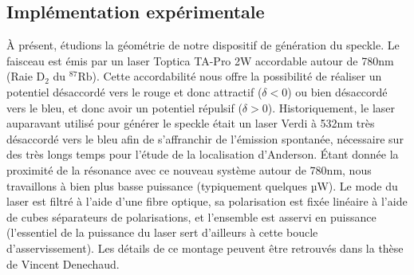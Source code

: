 
\subsection{Implémentation expérimentale}
À présent, étudions la géométrie de notre dispositif de génération du speckle. Le faisceau est émis par un laser Toptica TA-Pro 2W accordable autour de 780nm (Raie $\mathrm{D}_2$ du ${}^{87}\text{Rb}$). Cette accordabilité nous offre la possibilité de réaliser un potentiel désaccordé vers le rouge et donc attractif ($\delta < 0$) ou bien désaccordé vers le bleu, et donc avoir un potentiel répulsif ($\delta > 0$). Historiquement, le laser auparavant utilisé pour générer le speckle était un laser Verdi à 532nm très désaccordé vers le bleu afin de s'affranchir de l'émission spontanée, nécessaire sur des très longs temps pour l'étude de la localisation d'Anderson. Étant donnée la proximité de la résonance avec ce nouveau système autour de 780nm, nous travaillons à bien plus basse puissance (typiquement quelques µW). Le mode du laser est filtré à l'aide d'une fibre optique, sa polarisation est fixée linéaire à l'aide de cubes séparateurs de polarisations, et l'ensemble est asservi en puissance (l'essentiel de la puissance du laser sert d'ailleurs à cette boucle d'asservissement). Les détails de ce montage peuvent être retrouvés dans la thèse de Vincent Denechaud. 

